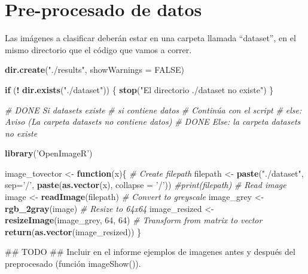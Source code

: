 \documentclass[]{article}
\newenvironment{Shaded}{\begin{snugshade}}{\end{snugshade}}
\newcommand{\KeywordTok}[1]{\textcolor[rgb]{0.13,0.29,0.53}{\textbf{#1}}}
\newcommand{\DataTypeTok}[1]{\textcolor[rgb]{0.13,0.29,0.53}{#1}}
\newcommand{\DecValTok}[1]{\textcolor[rgb]{0.00,0.00,0.81}{#1}}
\newcommand{\StringTok}[1]{\textcolor[rgb]{0.31,0.60,0.02}{#1}}
\newcommand{\CommentTok}[1]{\textcolor[rgb]{0.56,0.35,0.01}{\textit{#1}}}
\newcommand{\OtherTok}[1]{\textcolor[rgb]{0.56,0.35,0.01}{#1}}
\newcommand{\ControlFlowTok}[1]{\textcolor[rgb]{0.13,0.29,0.53}{\textbf{#1}}}
\newcommand{\OperatorTok}[1]{\textcolor[rgb]{0.81,0.36,0.00}{\textbf{#1}}}
\newcommand{\AlertTok}[1]{\textcolor[rgb]{0.94,0.16,0.16}{#1}}
\newcommand{\NormalTok}[1]{#1}
\begin{document}
\section{Pre-procesado de datos}\label{pre-procesado-de-datos}

Las imágenes a clasificar deberán estar en una carpeta llamada
``dataset'', en el mismo directorio que el código que vamos a correr.

\begin{Shaded}
\begin{Highlighting}[]
\KeywordTok{dir.create}\NormalTok{(}\StringTok{"./results"}\NormalTok{, }\DataTypeTok{showWarnings =} \OtherTok{FALSE}\NormalTok{)}

\ControlFlowTok{if}\NormalTok{ (}\OperatorTok{!}\StringTok{ }\KeywordTok{dir.exists}\NormalTok{(}\StringTok{"./dataset"}\NormalTok{)) \{}
  \KeywordTok{stop}\NormalTok{(}\StringTok{"El directorio ./dataset no existe"}\NormalTok{)}
\NormalTok{\}}

\CommentTok{# DONE Si datasets existe}
\CommentTok{#    si contiene datos}
\CommentTok{#        Continúa con el script}
\CommentTok{#    else: Aviso (La carpeta datasets no contiene datos)}
\CommentTok{# DONE Else: la carpeta datasets no existe}
\end{Highlighting}
\end{Shaded}

\begin{Shaded}
\begin{Highlighting}[]
\KeywordTok{library}\NormalTok{(}\StringTok{'OpenImageR'}\NormalTok{)}

\NormalTok{image_tovector <-}\StringTok{ }\ControlFlowTok{function}\NormalTok{(x)\{}
\CommentTok{# Create filepath}
\NormalTok{filepath <-}\StringTok{ }\KeywordTok{paste}\NormalTok{(}\StringTok{"./dataset"}\NormalTok{, }\DataTypeTok{sep=}\StringTok{'/'}\NormalTok{,}
                  \KeywordTok{paste}\NormalTok{(}\KeywordTok{as.vector}\NormalTok{(x), }\DataTypeTok{collapse =} \StringTok{'/'}\NormalTok{))}
\CommentTok{#print(filepath)}
\CommentTok{# Read image}
\NormalTok{image <-}\StringTok{ }\KeywordTok{readImage}\NormalTok{(filepath)}
\CommentTok{# Convert to greyscale}
\NormalTok{image_grey <-}\StringTok{ }\KeywordTok{rgb_2gray}\NormalTok{(image)}
\CommentTok{# Resize to 64x64}
\NormalTok{image_resized <-}\StringTok{ }\KeywordTok{resizeImage}\NormalTok{(image_grey, }\DecValTok{64}\NormalTok{, }\DecValTok{64}\NormalTok{)}
\CommentTok{# Transform from matrix to vector}
\KeywordTok{return}\NormalTok{(}\KeywordTok{as.vector}\NormalTok{(image_resized))}
\NormalTok{\}}

\NormalTok{## }\AlertTok{TODO}\NormalTok{ ## Incluir en el informe ejemplos de imagenes antes y después del preprocesado (función imageShow()).}
\end{Highlighting}
\end{Shaded}
\end{document}
